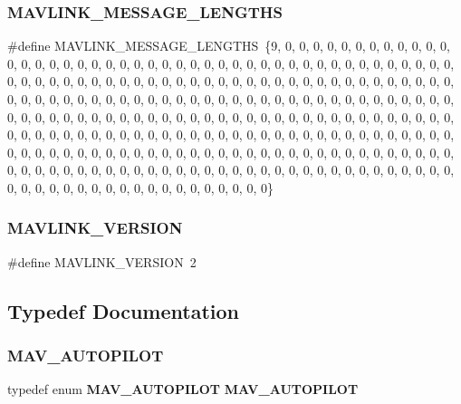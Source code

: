 \subsubsection{M\+A\+V\+L\+I\+N\+K\+\_\+\+M\+E\+S\+S\+A\+G\+E\+\_\+\+L\+E\+N\+G\+T\+HS}
{\footnotesize\ttfamily \#define M\+A\+V\+L\+I\+N\+K\+\_\+\+M\+E\+S\+S\+A\+G\+E\+\_\+\+L\+E\+N\+G\+T\+HS~\{9, 0, 0, 0, 0, 0, 0, 0, 0, 0, 0, 0, 0, 0, 0, 0, 0, 0, 0, 0, 0, 0, 0, 0, 0, 0, 0, 0, 0, 0, 0, 0, 0, 0, 0, 0, 0, 0, 0, 0, 0, 0, 0, 0, 0, 0, 0, 0, 0, 0, 0, 0, 0, 0, 0, 0, 0, 0, 0, 0, 0, 0, 0, 0, 0, 0, 0, 0, 0, 0, 0, 0, 0, 0, 0, 0, 0, 0, 0, 0, 0, 0, 0, 0, 0, 0, 0, 0, 0, 0, 0, 0, 0, 0, 0, 0, 0, 0, 0, 0, 0, 0, 0, 0, 0, 0, 0, 0, 0, 0, 0, 0, 0, 0, 0, 0, 0, 0, 0, 0, 0, 0, 0, 0, 0, 0, 0, 0, 0, 0, 0, 0, 0, 0, 0, 0, 0, 0, 0, 0, 0, 0, 0, 0, 0, 0, 0, 0, 0, 0, 0, 0, 0, 0, 0, 0, 0, 0, 0, 0, 0, 0, 0, 0, 0, 0, 0, 0, 0, 0, 0, 0, 0, 0, 0, 0, 0, 0, 0, 0, 0, 0, 0, 0, 0, 0, 0, 0, 0, 0, 0, 0, 0, 0, 0, 0, 0, 0, 0, 0, 0, 0, 0, 0, 0, 0, 0, 0, 0, 0, 0, 0, 0, 0, 0, 0, 0, 0, 0, 0, 0, 0, 0, 0, 0, 0, 0, 0, 0, 0, 0, 0, 0, 0, 0, 0, 0, 0, 0, 0, 0, 0, 0, 0, 0, 0, 0, 0, 0, 0, 0, 0, 0, 0, 0, 0\}}

\mbox{\label{minimal_8h_a713480f83cc8ffd484a19a4b9b690215}} 
\subsubsection{M\+A\+V\+L\+I\+N\+K\+\_\+\+V\+E\+R\+S\+I\+ON}
{\footnotesize\ttfamily \#define M\+A\+V\+L\+I\+N\+K\+\_\+\+V\+E\+R\+S\+I\+ON~2}



\subsection{Typedef Documentation}
\mbox{\label{minimal_8h_adf91ae0e6fbb9f42b840d1797c8349fb}} 
\subsubsection{M\+A\+V\+\_\+\+A\+U\+T\+O\+P\+I\+L\+OT}
{\footnotesize\ttfamily typedef enum \textbf{ M\+A\+V\+\_\+\+A\+U\+T\+O\+P\+I\+L\+OT}  \textbf{ M\+A\+V\+\_\+\+A\+U\+T\+O\+P\+I\+L\+OT}}

